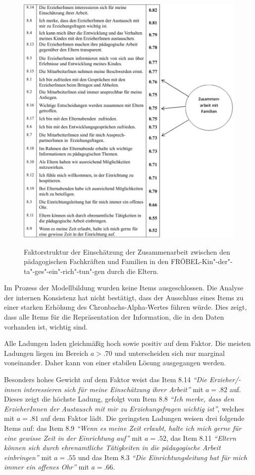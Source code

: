 \documentclass[12pt,a4paper]{article}
\begin{document}
\begin{figure}[h!]
\caption{Faktorstruktur der Einschätzung der Zusammenarbeit zwischen den pädagogischen Fachkräften und Familien in den FRÖBEL-Kin"-der"-ta"-ges"-ein"-rich"-tun"-gen durch die Eltern.}
\centering
\includegraphics[scale=0.85]{figures/faktorladung2.pdf}
\label{fig_fak}
\end{figure}

Im Prozess der Modellbildung wurden keine Items ausgeschlossen. Die Analyse der internen Konsistenz hat nicht bestätigt, dass der Ausschluss eines Items zu einer starken Erhöhung des Chronbachs-Alpha-Wertes führen würde. Dies zeigt, dass alle Items für die Repräsentation der Information, die in den Daten vorhanden ist, wichtig sind.

	Alle Ladungen laden gleichmäßig hoch sowie positiv auf dem Faktor. Die meisten Ladungen liegen im Bereich $a >.70$ und unterscheiden sich nur marginal voneinander. Daher kann von einer stabilen Lösung ausgegangen werden.
	
	Besonders hohes Gewicht auf dem Faktor weist das Item 8.14 \textit{"`Die Erzieher/-innen interessieren sich für meine Einschätzung ihrer Arbeit"'} mit $a= .82$ auf. Dieses zeigt die höchste Ladung, gefolgt vom Item 8.8 \textit{"`Ich merke, dass den ErzieherInnen der Austausch mit mir zu Erziehungsfragen wichtig ist"'}, welches mit $a = .81$ auf dem Faktor lädt.
	Die geringsten Ladungen weisen drei folgende Items auf: das Item 8.9 \textit{"`Wenn es meine Zeit erlaubt, halte ich mich gerne für eine gewisse Zeit in der Einrichtung auf"'} mit $a = .52$, das Item 8.11 \textit{"`Eltern können sich durch ehrenamtliche Tätigkeiten in die pädagogische Arbeit einbringen"'} mit $a = .55$ und das Item 8.3 \textit{"`Die Einrichtungsleitung hat für mich immer ein offenes Ohr"'} mit $a = .66$.   
	
\end{document}
